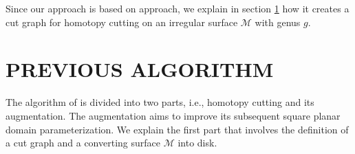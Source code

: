 \documentclass[a4paper,twoside]{article}
\begin{document}
Since our approach is based on \cite{Gu:2002:GI:566654.566589} approach, we explain in section \ref{sec:previous algorithm} how it creates a cut graph for homotopy cutting on an irregular surface $\mathscr{M}$ with genus $g$.
\section{\uppercase{Previous Algorithm}}
\label{sec:previous algorithm}
\noindent The algorithm of \cite{Gu:2002:GI:566654.566589} is divided into two parts, i.e., homotopy cutting and its augmentation. The augmentation aims to improve its subsequent square planar domain parameterization. We explain the first part that involves the definition of a cut graph and a converting surface $\mathscr{M}$ into disk.

\begin{figure}[t]
	\centering		
	\hspace{10pt}
	\hspace{10pt}
	\hspace{10pt}
	\hspace{10pt}		

\end{figure}
\end{document}
